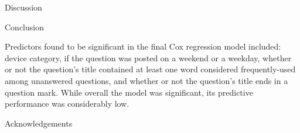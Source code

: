 \documentclass[final]{beamer}
\newlength{\onecolwid}
\begin{document}
\begin{frame}[t]
\begin{columns}[t]
\begin{column}{\onecolwid}
\begin{block}{Discussion}
\end{block}


\begin{block}{Conclusion}

Predictors found to be significant in the final Cox regression model included: device category, if the question was posted on a weekend or a weekday, whether or not the question's title contained at least one word considered frequently-used among unanswered questions, and whether or not the question's title ends in a question mark. While overall the model was significant, its predictive performance was considerably low. 


\end{block}


% 
% 


% 
% 



\begin{block}{Acknowledgements}


\end{block}
\end{column}
\end{columns}
\end{frame}
\end{document}

